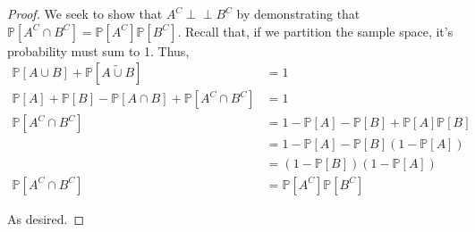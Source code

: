 \documentclass{article}
\newcommand{\indep}{\perp \!\!\! \perp}
\begin{document}
\subsection{}

\subsection{}

\subsection{}

\subsection{}

\newpage %
\section{}
\subsection{}
\begin{proof}
We seek to show that $A^C \indep B^C$ by demonstrating that $\mathbb{P}[A^C \cap B^C] = \mathbb{P}[A^C] \mathbb{P}[B^C]$. Recall that, if we partition the sample space, it's probability must sum to 1. Thus,
\begin{align}
    \mathbb{P}[A \cup B] + \mathbb{P}[\widetilde{A \cup B}] &= 1 \\
    \mathbb{P}[A] + \mathbb{P}[B] - \mathbb{P}[A \cap B] + \mathbb{P}[A^C \cap B^C] &= 1 \\
    \mathbb{P}[A^C \cap B^C] &= 1 - \mathbb{P}[A] - \mathbb{P}[B] + \mathbb{P}[A] \mathbb{P}[B] \\
    &= 1 - \mathbb{P}[A] - \mathbb{P}[B](1 - \mathbb{P}[A]) \\
    &= (1 - \mathbb{P}[B])(1- \mathbb{P}[A]) \\
    \mathbb{P}[A^C \cap B^C] &= \mathbb{P}[A^C] \mathbb{P}[B^C] 
\end{align}

As desired.
\end{proof}


\subsection{}
\end{document}
